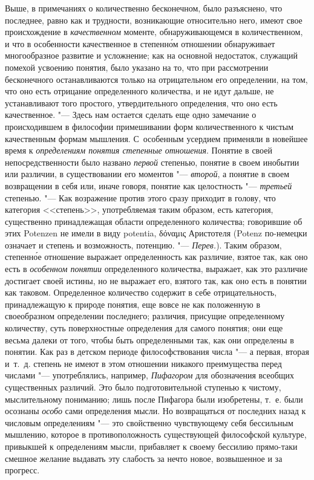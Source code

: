 Выше, в примечаниях о количественно бесконечном, было разъяснено, что
последнее, равно как и трудности, возникающие относительно него, имеют свое
происхождение в {\em качественном} моменте,
обнаруживающемся в количественном, и что в особенности качественное в
степенн\'{о}м отношении обнаруживает многообразное развитие и усложнение; как
на основной недостаток, служащий помехой усвоению понятия, было указано на
то, что при рассмотрении бесконечного останавливаются только на
отрицательном его определении, на том, что оно есть отрицание определенного
количества, и не идут дальше, не устанавливают того простого,
утвердительного определения, что оно есть качественное. "--- Здесь нам
остается сделать еще одно замечание о происходившем в философии
примешивании форм количественного к чистым качественным формам мышления.
С~особенным усердием применяли в новейшее время к
{\em определениям понятия степенные
отношения}.
Понятие в своей непосредственности было названо
{\em первой} степенью, понятие в своем инобытии или
различии, в существовании его моментов "--- {\em второй},
а понятие в своем возвращении в себя или, иначе говоря, понятие как
целостность "--- {\em третьей} степенью. "--- Как возражение
против этого сразу приходит в голову, что категория <<степень>>,
употребляемая таким образом, есть категория, существенно принадлежащая
области определенного количества; говорившие об этих Potenzen не имели в
виду potentia, \textgreek{δόναμις}
Аристотеля (Potenz по-немецки означает и степень и возможность, потенцию.
"--- {\em Перев.}). Таким образом, степенн\'{о}е отношение выражает
определенность как различие, взятое так, как оно есть в
{\em особенном понятии} определенного количества,
выражает, как это различие достигает своей истины, но не выражает его,
взятого так, как оно есть в понятии как таковом. Определенное количество
содержит в себе отрицательность, принадлежащую к природе понятия, еще вовсе
не как положенную в своеобразном определении последнего; различия, присущие
определенному количеству, суть поверхностные определения для самого
понятия; они еще весьма далеки от того, чтобы быть определенными так, как
они определены в понятии. Как раз в детском периоде философствования числа
"--- а первая, вторая и~т.~д. степень не имеют в этом отношении никакого
преимущества перед числами "--- употреблялись, например,
{\em Пифагором} для обозначения всеобщих существенных
различий. Это было подготовительной ступенью к чистому, мыслительному
пониманию; лишь после Пифагора были изобретены, т.~е. были осознаны
{\em особо} сами определения мысли. Но возвращаться от
последних назад к числовым определениям "--- это свойственно чувствующему себя
бессильным мышлению, которое в противоположность существующей философской
культуре, привыкшей к определениям мысли, прибавляет к своему бессилию
прямо-таки смешное желание выдавать эту слабость за нечто новое,
возвышенное и за прогресс.

